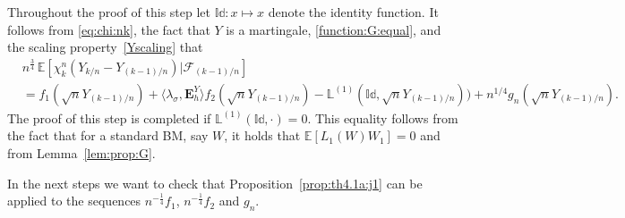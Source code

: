 \documentclass[12pt]{article}
\numberwithin{equation}{section}
\theoremstyle{definition}
\theoremstyle{remark}
\newcommand{\EE}{\mathbb{E}}
\newcommand{\cQ}{\mathcal{Q}}
\newcommand{\cF}{\mathcal{F}}
\newcommand{\ind}[1]{\mathbf{1}_{#1}}
\newcommand{\vd}{\,\mathrm{d}}
\newcommand{\bfH}[1]{\mathbf{E}^Y_{#1}}
\newcommand{\bfG}[1]{\mathbf{G}_{#1}}
\newcommand{\Lm}[3]{\mathbb{L}^{(#2)}(#1,#3)}
\begin{document}
Throughout the proof of this step let $\mathbb{Id} \colon x\mapsto x$ denote the identity function.
It follows from \eqref{eq:chi:nk}, the fact that $Y$ is a martingale, \eqref{function:G:equal},
and the scaling property~\eqref{Yscaling}
that
\begin{equation}
\begin{split}
	& n^{\frac34} \, \EE\!\left[\chi_k^n (Y_{k/n} - Y_{(k-1)/n})  | \cF_{(k-1)/n}\right] 
	\\
	& =  f_1(\sqrt{n} Y_{(k-1)/n}) +  \langle \lambda_\sigma , \bfH h \rangle f_2(\sqrt{n} Y_{(k-1)/n})
	- \Lm{ \mathbb{Id} }{1}{\sqrt{n} Y_{(k-1)/n}} )
	+ n^{1/4}g_n(\sqrt{n}Y_{(k-1)/n}).
\end{split}
\end{equation}
The proof of this step is completed if
$ \Lm{ \mathbb{Id} }{1}{\cdot} =0$.
This equality follows from the fact that for a standard BM, say $W$, it holds that $\EE\!\left[ L_1(W)  W_1  \right]=0$
and from Lemma~\ref{lem:prop:G}. 

In the next steps we want to check that Proposition~\ref{prop:th4.1a:j1} can be applied to the sequences $n^{-\frac14} f_1$, $n^{-\frac14} f_2$ and $g_n$. 
\end{document}
